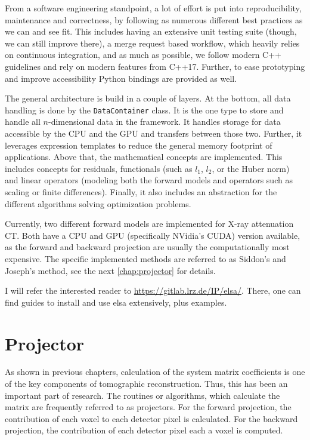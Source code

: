 From a software engineering standpoint, a lot of effort is put into reproducibility, maintenance and
correctness, by following as numerous different best practices as we can and see fit. This includes
having an extensive unit testing suite (though, we can still improve there), a merge request based
workflow, which heavily relies on continuous integration, and as much as possible, we follow modern
C++ guidelines and rely on modern features from C++17. Further, to ease prototyping and improve
accessibility Python bindings are provided as well.

The general architecture is build in a couple of layers. At the bottom, all data handling is done
by the \texttt{DataContainer} class. It is the one type to store and handle all
\(n\)-dimensional data in the framework. It handles storage for data accessible by the \gls{CPU} and
the \gls{GPU} and transfers between those two. Further, it leverages expression templates to reduce
the general memory footprint of applications. Above that, the mathematical concepts are implemented.
This includes concepts for residuals, functionals (such as \(l_1\), \(l_2\), or the Huber norm) and
linear operators (modeling both the forward models and operators such as scaling or finite
differences). Finally, it also includes an abstraction for the different algorithms solving
optimization problems.

Currently, two different forward models are implemented for X-ray attenuation CT. Both have a
\gls{CPU} and \gls{GPU} (specifically NVidia's CUDA) version available, as the forward and backward
projection are usually the computationally most expensive. The specific implemented methods are
referred to as Siddon's and Joseph's method, see the next \autoref{chap:projector} for details.

I will refer the interested reader to
\href{https://gitlab.lrz.de/IP/elsa/}{https://gitlab.lrz.de/IP/elsa/}. There, one can find guides to
install and use elsa extensively, plus examples.

\chapter{Projector}\label{chap:projector}

As shown in previous chapters, calculation of the system matrix coefficients is one of the key
components of tomographic reconstruction. Thus, this has been an important part of research. The
routines or algorithms, which calculate the matrix are frequently referred to as projectors. For the
forward projection, the contribution of each voxel to each detector pixel is calculated. For the
backward projection, the contribution of each detector pixel each a voxel is computed.

